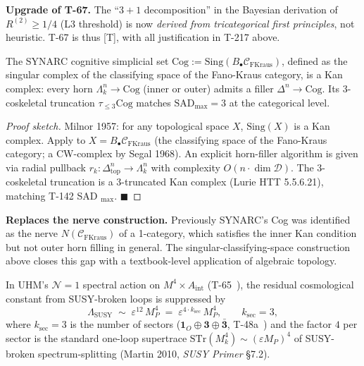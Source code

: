 \textbf{Upgrade of T-67.} The ``$3+1$ decomposition'' in the Bayesian
derivation of $R^{(2)} \geq 1/4$ (L3 threshold) is now
\emph{derived from tricategorical first principles}, not heuristic.
T-67 is thus [T], with all justification in T-217 above.

\begin{theorembox}
\label{thm:t218-cog-kan}
The SYNARC cognitive simplicial set
$\mathrm{Cog} := \mathrm{Sing}(B_\bullet \mathcal C_{\mathrm{FKraus}})$,
defined as the singular complex of the classifying space of the
Fano-Kraus category, is a Kan complex: every horn $\Lambda^n_k \to
\mathrm{Cog}$ (inner or outer) admits a filler $\Delta^n \to \mathrm{Cog}$.
Its 3-coskeletal truncation $\tau_{\leq 3}\mathrm{Cog}$ matches
$\mathrm{SAD}_{\max} = 3$ at the categorical level.
\end{theorembox}

\begin{proof}[Proof sketch]
Milnor 1957: for any topological space $X$, $\mathrm{Sing}(X)$ is a Kan
complex. Apply to $X = B_\bullet \mathcal C_{\mathrm{FKraus}}$ (the
classifying space of the Fano-Kraus category; a CW-complex by
Segal 1968). An explicit horn-filler algorithm is given via radial
pullback $r_k : \Delta^n_{\mathrm{top}} \to \Lambda^n_k$ with complexity
$O(n \cdot \dim \mathcal D)$. The 3-coskeletal truncation is a
3-truncated Kan complex (Lurie HTT 5.5.6.21), matching T-142 SAD
$_{\max}$. $\blacksquare$
\end{proof}

\textbf{Replaces the nerve construction.} Previously SYNARC's Cog was
identified as the nerve $N(\mathcal C_{\mathrm{FKraus}})$ of a 1-category,
which satisfies the inner Kan condition but not outer horn filling in
general. The singular-classifying-space construction above closes this
gap with a textbook-level application of algebraic topology.

\begin{theorembox}
\label{thm:t219-lambda-susy}
In UHM's $\mathcal N = 1$ spectral action on $M^4 \times A_{\mathrm{int}}$
(T-65~), the residual cosmological constant from SUSY-broken
loops is suppressed by
\[
  \Lambda_{\mathrm{SUSY}} \;\sim\; \varepsilon^{12}\, M_P^4 \;=\;
  \varepsilon^{4 \cdot k_{\mathrm{sec}}}\, M_P^4, \qquad k_{\mathrm{sec}} = 3,
\]
where $k_{\mathrm{sec}} = 3$ is the number of sectors
($\mathbf 1_O \oplus \mathbf 3 \oplus \bar{\mathbf 3}$, T-48a~)
and the factor $4$ per sector is the standard one-loop supertrace
$\mathrm{STr}(M_k^4) \sim (\varepsilon M_P)^4$ of SUSY-broken
spectrum-splitting (Martin 2010, \emph{SUSY Primer} \S7.2).
\end{theorembox}

